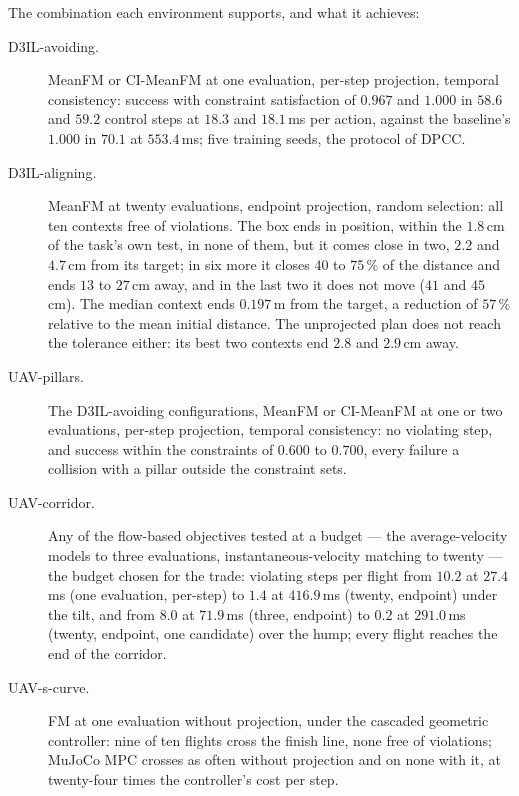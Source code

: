 The combination each environment supports, and what it achieves:

\begin{description}
  \item[D3IL-avoiding.] MeanFM or CI-MeanFM at one evaluation, per-step projection, temporal consistency:
    success with constraint satisfaction of $0.967$ and $1.000$ in $58.6$ and $59.2$ control steps at $18.3$
    and $18.1$\,ms per action, against the baseline's $1.000$ in $70.1$ at $553.4$\,ms; five training seeds,
    the protocol of \ac{DPCC}.
  \item[D3IL-aligning.] MeanFM at twenty evaluations, endpoint projection, random selection: all ten contexts
    free of violations. The box ends in position, within the $1.8$\,cm of the task's own test, in none of
    them, but it comes close in two, $2.2$ and $4.7$\,cm from its target; in six more it closes $40$ to
    $75\,\%$ of the distance and ends $13$ to $27$\,cm away, and in the last two it does not move ($41$ and
    $45$\,cm). The median context ends $0.197$\,m from the target, a reduction of $57\,\%$ relative to the mean initial
    distance.
    The unprojected plan does not reach the tolerance either: its best two contexts end $2.8$ and $2.9$\,cm
    away.
  \item[UAV-pillars.] The D3IL-avoiding configurations, MeanFM or CI-MeanFM at one or two evaluations,
    per-step projection, temporal consistency: no violating step, and success within the constraints of
    $0.600$ to $0.700$, every failure a collision with a pillar outside the constraint sets.
  \item[UAV-corridor.] Any of the flow-based objectives tested at a budget --- the average-velocity models to
    three evaluations, instantaneous-velocity matching to twenty --- the budget chosen for the trade:
    violating steps per flight
    from $10.2$ at $27.4$\,ms (one evaluation, per-step) to $1.4$ at $416.9$\,ms (twenty, endpoint) under the
    tilt, and from $8.0$ at $71.9$\,ms (three, endpoint) to $0.2$ at $291.0$\,ms (twenty, endpoint, one
    candidate) over the hump; every flight reaches the end of the corridor.
  \item[UAV-s-curve.] FM at one evaluation without projection, under the cascaded geometric controller: nine
    of ten flights cross the finish line, none free of violations; MuJoCo MPC crosses as often without
    projection and on none with it, at twenty-four times the controller's cost per step.
\end{description}
